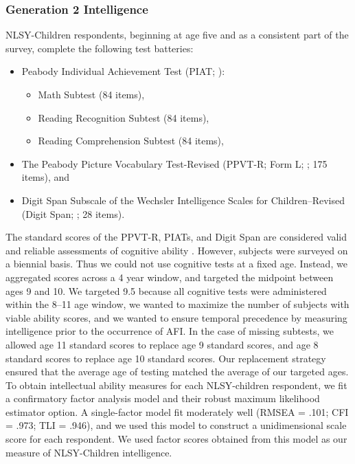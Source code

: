 \documentclass[a4paper,man,apacite,natbib,12pt,longtable]{apa6}\usepackage[]{graphicx}\usepackage[]{color}
\begin{document}
\subsubsection{Generation 2 Intelligence}
NLSY-Children respondents, beginning at age five and as a consistent part of the survey, complete the following test batteries: \begin{itemize}
\item Peabody Individual Achievement Test (PIAT; \citealp{dunn1970peabody}):\begin{itemize}\item Math Subtest (84 items),
\item Reading Recognition Subtest (84 items),
\item Reading Comprehension Subtest (84 items),\end{itemize}
\item The Peabody Picture Vocabulary Test-Revised (PPVT-R; Form L; \citealp{dunn1981peabody}; 175 items), and
\item Digit Span Subscale of the Wechsler Intelligence Scales for Children--Revised (Digit Span; \citealp{wechsler1974manual}; 28 items).\end{itemize}
The standard scores of the PPVT-R, PIATs, and Digit Span are considered valid and reliable assessments of cognitive ability \citep{mott1995nlsy}. However, subjects were surveyed on a biennial basis. Thus we could not use cognitive tests at a fixed age. Instead, we aggregated scores across a 4 year window, and targeted the midpoint between ages 9 and 10. We targeted 9.5 because all cognitive tests were administered within the 8--11 age window, we wanted to maximize the number of subjects with viable ability scores, and we wanted to ensure temporal precedence by measuring intelligence prior to the occurrence of AFI. In the case of missing subtests, we allowed age 11 standard scores to replace age 9 standard scores, and age 8 standard scores to replace age 10 standard scores. Our replacement strategy ensured that the average age of testing matched the average of our targeted ages. To obtain intellectual ability measures for each NLSY-children respondent, we fit a confirmatory factor analysis model \citep[using Mplus;][]{mplus} and their robust maximum likelihood estimator option. A single-factor model fit moderately well (RMSEA = .101; CFI = .973; TLI = .946), and we used this model to construct a unidimensional scale score for each respondent. We used factor scores obtained from this model as our measure of NLSY-Children intelligence.
\end{document}
